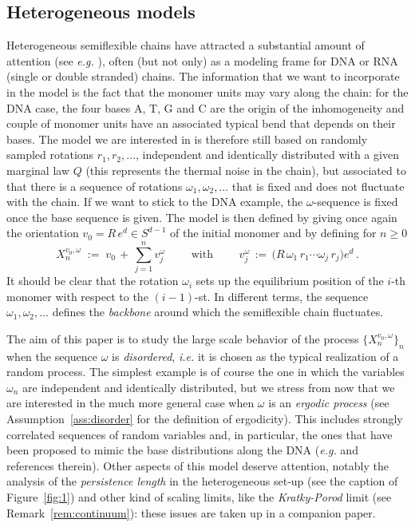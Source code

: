 \documentclass[a4paper,reqno,11pt]{amsart}
\numberwithin{equation}{section}
\newcommand{\go}{\omega}
\begin{document}

\smallskip

\subsection{Heterogeneous models}
Heterogeneous semiflexible chains have attracted a substantial
amount of attention (see {\sl e.g.} \cite{cf:BDM,cf:MN,cf:Vaillant,cf:WN,cf:ZC}),  
often (but not only) as  a  modeling frame  for DNA or RNA (single or double stranded) chains. 
The information that we want to incorporate in the model
is the fact that the monomer units may vary along the chain:
for the DNA case, the four bases A, T, G and C are the origin
of the inhomogeneity and couple of monomer units  have an associated typical bend
that depends on their bases. The model we are interested
in is therefore still based on randomly sampled rotations $r_1, r_2, \ldots$,
independent and identically distributed with a given marginal law $Q$
(this represents the thermal noise in the chain), but associated to that there is a sequence
of rotations $\go_1, \go_2,\ldots$ that is fixed and does not
fluctuate with the chain. If we want to stick to the  DNA example,
the $\go$-sequence is fixed once the base sequence is given.
The model is then defined by giving once again the orientation
$v_0 = R \, e^d \in S^{d-1}$
of the initial monomer and by defining for $n \ge 0$
\begin{equation} \label{eq:X}
X_n^{v_0, \go} \; := \; v_0 \,+\, \sum_{j=1}^n v_j^\go \qquad \text{ with } \qquad
v_j^\go\, :=\,  \big( R \,\go_1\, r_1 \cdots \go_j \, r_j \big) e^d \,.
\end{equation}
It should be clear that the rotation $\go_i$ sets up the equilibrium position
of the $i$-th monomer with respect to the $(i-1)$-st. 
In different terms, the
sequence $\go_1, \go_2, \ldots$ defines the {\sl backbone} around which the semiflexible
chain fluctuates.
 
\smallskip
 
The aim of this paper is to study 
the large scale behavior of the process $\{X_n^{v_0, \go}\}_{n}$ when the sequence
$\go$ is {\sl disordered}, {\sl i.e.} it is chosen as the typical
realization of a random process. The simplest example
is of course the one in which the variables $\go_n$ are independent
and identically distributed, but we stress from now that
we are interested in the much more general case when $\go$ is an
{\sl ergodic process} (see Assumption~\ref{ass:disorder} for
the definition of ergodicity). This includes strongly correlated 
sequences of random variables and, in particular, the ones that
have been proposed to mimic the base distributions along the DNA
({\sl e.g.} \cite{cf:Vaillant} and references therein).
Other aspects of this model deserve attention, notably the analysis 
of the {\sl persistence length} in the heterogeneous set-up
(see the caption of Figure~\ref{fig:1})
and other kind of scaling limits, like the {\sl Kratky-Porod} limit
(see Remark~\ref{rem:continuum}):
these issues are taken up in a companion paper.
\end{document}
